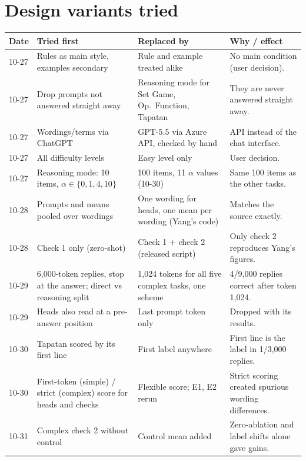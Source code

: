 \documentclass[10pt,a4paper]{article}
\begin{document}
\section{Design variants tried}

\small
\begin{tabularx}{\textwidth}{@{}p{1.5cm}LLL@{}}
\toprule
\textbf{Date} & \textbf{Tried first} & \textbf{Replaced by} & \textbf{Why / effect} \\
-27 & Rules as main style, examples secondary & Rule and example treated alike & No main condition (user decision). \\
10-27 & Drop prompts not answered straight away & Reasoning mode for Set Game, Op.\ Function, Tapatan & They are never answered straight away. \\
10-27 & Wordings/terms via ChatGPT & GPT-5.5 via Azure API, checked by hand & API instead of the chat interface. \\
10-27 & All difficulty levels & Easy level only & User decision. \\
10-27 & Reasoning mode: 10 items, $\alpha\in\{0,1,4,10\}$ & 100 items, 11 $\alpha$ values (10-30) & Same 100 items as the other tasks. \\
10-28 & Prompts and means pooled over wordings & One wording for heads, one mean per wording (Yang's code) & Matches the source exactly. \\
10-28 & Check 1 only (zero-shot) & Check 1 + check 2 (released script) & Only check 2 reproduces Yang's figures. \\
10-29 & 6,000-token replies, stop at the answer; direct vs reasoning split & 1,024 tokens for all five complex tasks, one scheme & 4/9,000 replies correct after token 1,024. \\
10-29 & Heads also read at a pre-answer position & Last prompt token only & Dropped with its results. \\
10-30 & Tapatan scored by its first line & First label anywhere & First line is the label in 1/3,000 replies. \\
10-30 & First-token (simple) / strict (complex) score for heads and checks & Flexible score; E1, E2 rerun & Strict scoring created spurious wording differences. \\
10-31 & Complex check 2 without control & Control mean added & Zero-ablation and label shifts alone gave gains. \\
\bottomrule
\end{tabularx}
\normalsize
\end{document}
